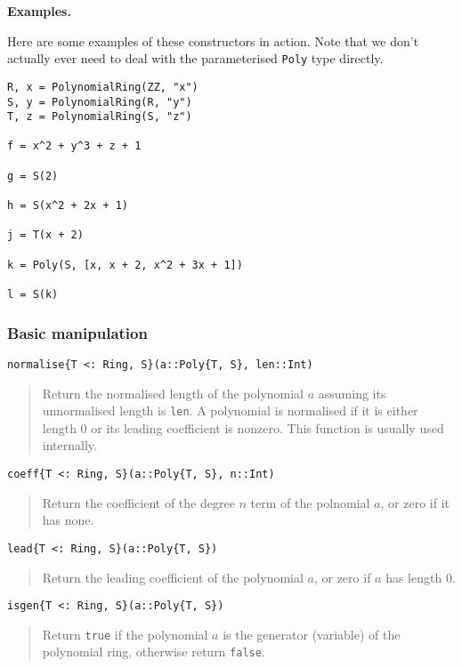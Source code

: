 \documentclass[a4paper,10pt]{article}
\newcommand{\code}{\lstinline}
\newcommand{\desc}[1]{\vspace{-3mm}\begin{quote}#1\end{quote}}
\begin{document}
{{{\textbf{Examples.}

Here are some examples of these constructors in action. Note that we don't actually
ever need to deal with the parameterised \code{Poly} type directly.

\begin{lstlisting}
R, x = PolynomialRing(ZZ, "x")
S, y = PolynomialRing(R, "y")
T, z = PolynomialRing(S, "z")

f = x^2 + y^3 + z + 1

g = S(2)

h = S(x^2 + 2x + 1)

j = T(x + 2)

k = Poly(S, [x, x + 2, x^2 + 3x + 1])

l = S(k)
\end{lstlisting}

\subsubsection{Basic manipulation}

\begin{lstlisting}
normalise{T <: Ring, S}(a::Poly{T, S}, len::Int)
\end{lstlisting}

\desc{Return the normalised length of the polynomial $a$ assuming its unnormalised
length is \code{len}. A polynomial is normalised if it is either length $0$ or its
leading coefficient is nonzero. This function is usually used internally.}

\begin{lstlisting}
coeff{T <: Ring, S}(a::Poly{T, S}, n::Int)
\end{lstlisting}

\desc{Return the coefficient of the degree $n$ term of the polnomial $a$, or zero
if it has none.}

\begin{lstlisting}
lead{T <: Ring, S}(a::Poly{T, S})
\end{lstlisting}

\desc{Return the leading coefficient of the polynomial $a$, or zero if $a$ has
length $0$.}

\begin{lstlisting}
isgen{T <: Ring, S}(a::Poly{T, S})
\end{lstlisting}

\desc{Return \code{true} if the polynomial $a$ is the generator (variable) of the
polynomial ring, otherwise return \code{false}.}

}}}
\end{document}
